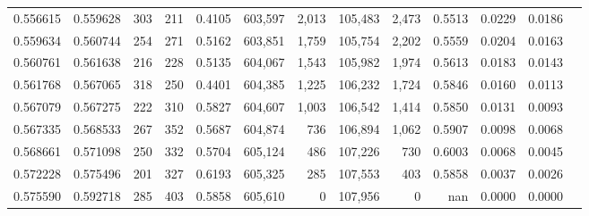 \begin{tabular}{rrrrrrrrrrrrr}
0.556615 & 0.559628 &    303 &   211 &                                     0.4105 & 603,597 &   2,013 & 105,483 &   2,473 & 0.5513 & 0.0229 & 0.0186 \\
0.559634 & 0.560744 &    254 &   271 &                                     0.5162 & 603,851 &   1,759 & 105,754 &   2,202 & 0.5559 & 0.0204 & 0.0163 \\
0.560761 & 0.561638 &    216 &   228 &                                     0.5135 & 604,067 &   1,543 & 105,982 &   1,974 & 0.5613 & 0.0183 & 0.0143 \\
0.561768 & 0.567065 &    318 &   250 &                                     0.4401 & 604,385 &   1,225 & 106,232 &   1,724 & 0.5846 & 0.0160 & 0.0113 \\
0.567079 & 0.567275 &    222 &   310 &                                     0.5827 & 604,607 &   1,003 & 106,542 &   1,414 & 0.5850 & 0.0131 & 0.0093 \\
0.567335 & 0.568533 &    267 &   352 &                                     0.5687 & 604,874 &     736 & 106,894 &   1,062 & 0.5907 & 0.0098 & 0.0068 \\
0.568661 & 0.571098 &    250 &   332 &                                     0.5704 & 605,124 &     486 & 107,226 &     730 & 0.6003 & 0.0068 & 0.0045 \\
0.572228 & 0.575496 &    201 &   327 &                                     0.6193 & 605,325 &     285 & 107,553 &     403 & 0.5858 & 0.0037 & 0.0026 \\
0.575590 & 0.592718 &    285 &   403 &                                     0.5858 & 605,610 &       0 & 107,956 &       0 &    nan & 0.0000 & 0.0000 \\
\bottomrule
\end{tabular}
